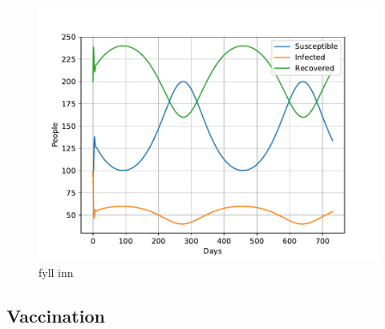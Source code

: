 \documentclass[a4paper]{article}
\let\Oldsubsection\subsection
\renewcommand{\subsection}{\FloatBarrier\Oldsubsection}
\begin{document}
\begin{figure}[!htb]
	\includegraphics[scale=0.56]{../plots/opp_d_D.pdf}
	\caption{fyll inn}
	\label{opp_d0}
\end{figure}


\subsection{Vaccination}
\end{document}
